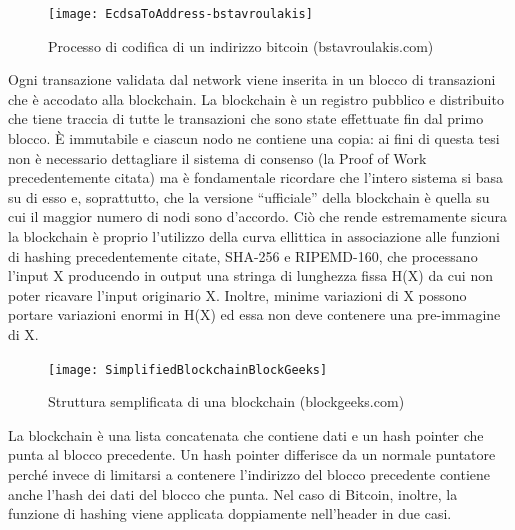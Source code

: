 \begin{figure}[h!]
\centering
\texttt{[image: EcdsaToAddress-bstavroulakis]}
\caption{Processo di codifica di un indirizzo bitcoin (bstavroulakis.com)}
\label{fig:ecdsatoaddress-bstavroulakis}
\end{figure}


Ogni transazione validata dal network viene inserita in un blocco di transazioni che è accodato alla blockchain.
La blockchain è un registro pubblico e distribuito che tiene traccia di tutte le transazioni che sono state effettuate fin dal primo blocco. È immutabile e ciascun nodo ne contiene una copia: ai fini di questa tesi non è necessario dettagliare il sistema di consenso (la Proof of Work precedentemente citata) ma è fondamentale ricordare che l’intero sistema si basa su di esso e, soprattutto, che la versione “ufficiale” della blockchain è quella su cui il maggior numero di nodi sono d’accordo. Ciò che rende estremamente sicura la blockchain è proprio l’utilizzo della curva ellittica in associazione alle funzioni di hashing precedentemente citate, SHA-256 e RIPEMD-160, che processano l’input X producendo in output una stringa di lunghezza fissa H(X) da cui non poter ricavare l’input originario X. Inoltre, minime variazioni di X possono portare variazioni enormi in H(X) ed essa non deve contenere una pre-immagine di X.

\begin{figure}[h!]
\centering
\texttt{[image: SimplifiedBlockchainBlockGeeks]}
\caption{Struttura semplificata di una blockchain (blockgeeks.com)}
\label{fig:simplifiedblockchainblockgeeks}
\end{figure}


La blockchain è una lista concatenata che contiene dati e un hash pointer che punta al blocco precedente. Un hash pointer differisce da un normale puntatore perché invece di limitarsi a contenere l’indirizzo del blocco precedente contiene anche l’hash dei dati del blocco che punta. Nel caso di Bitcoin, inoltre, la funzione di hashing viene applicata doppiamente nell’header in due casi.\\

